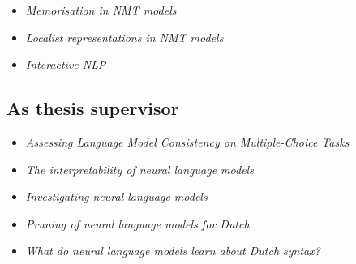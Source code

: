 {{{
{\begin{itemize}
  \item[] \textit{Memorisation in NMT models}
\end{itemize}
}}

{
{\begin{itemize}
  \item[] \textit{Localist representations in NMT models}
\end{itemize}
}}

{
{\begin{itemize}
  \item[] \textit{Interactive NLP}
\end{itemize}
}}

\subsection{As thesis supervisor}

{
{\begin{itemize}
  \item[] \textit{Assessing Language Model Consistency on Multiple-Choice Tasks}
\end{itemize}
}}

{
{\begin{itemize}
  \item[] \textit{The interpretability of neural language models}
\end{itemize}
}}

{
{\begin{itemize}
  \item[] \textit{Investigating neural language models}
\end{itemize}
}}

{
{\begin{itemize}
  \item[] \textit{Pruning of neural language models for Dutch}
\end{itemize}
}}

{
{\begin{itemize}
  \item[] \textit{What do neural language models learn about Dutch syntax?}
\end{itemize}
}}

}}
